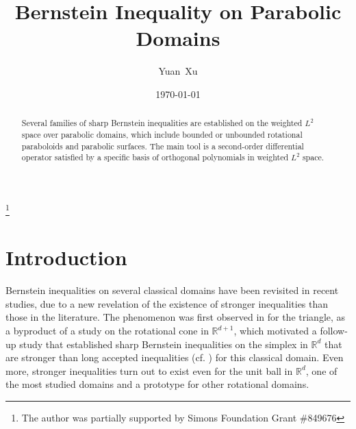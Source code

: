 \documentclass{amsart}
\theoremstyle{remark}
\def\RR{{\mathbb R}}
\begin{document}
 
\title{Bernstein Inequality on Parabolic Domains}
\author{Yuan~Xu}
\address{Department of Mathematics, University of Oregon, Eugene,
OR 97403--1222, USA}
\thanks{The author was partially supported by Simons Foundation Grant \#849676}
\date{\today}
\keywords{}

\begin{abstract}
Several families of sharp Bernstein inequalities are established on the weighted $L^2$ space over 
parabolic domains, which include bounded or unbounded rotational paraboloids and parabolic surfaces. 
The main tool is a second-order differential operator satisfied by a specific basis of orthogonal polynomials 
in weighted $L^2$ space. 
\end{abstract}

\maketitle

\section{Introduction}
\setcounter{equation}{0}
 
Bernstein inequalities on several classical domains have been revisited in recent studies, due to a 
new revelation of the existence of stronger inequalities than those in the literature. The phenomenon 
was first observed in \cite{X23b} for the triangle, as a byproduct of a study 
on the rotational cone in $\RR^{d+1}$, which motivated a follow-up study \cite{GX} that established sharp 
Bernstein inequalities on the simplex in $\RR^d$ that are stronger than long accepted inequalities (cf. \cite{Dit})
for this classical domain. Even more, stronger inequalities turn out to exist  \cite{BX} even for the unit ball in 
$\RR^d$, one of the most studied domains and a prototype for other rotational domains. 
\end{document}
